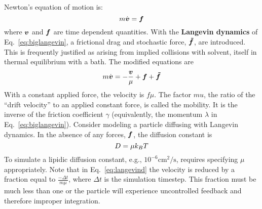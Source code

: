 
 \label{sec:timescales}


Newton's equation of motion is:
\begin{equation}
m \dot{\boldsymbol{v}} = \boldsymbol{f}
\end{equation}
where $\boldsymbol{v}$ and $\boldsymbol{f}$ are time dependent quantities.
With the {\bf Langevin dynamics} of Eq.~\ref{eq:biglangevin}, a frictional drag and stochastic force, $\boldsymbol{\tilde{f}}$, are introduced.
This is frequently justified as arising from implied collisions with solvent, itself in thermal equilibrium with a bath.
The modified equations are
\begin{equation}
m \dot{\boldsymbol{v}} = -\frac{\boldsymbol{v}}{\mu} + \boldsymbol{f} + \boldsymbol{\tilde{f}}
\end{equation}
With a constant applied force, the velocity is $f \mu$.
The factor $mu$, the ratio of the ``drift velocity'' to an applied constant force, is called the mobility. 
It is the inverse of the friction coefficient $\gamma$ (equivalently, the momentum $\lambda$ in Eq.~\ref{eq:biglangevin}).
Consider modeling a particle diffusing with Langevin dynamics.
In the absence of any forces, $\boldsymbol{f}$, the diffusion constant is
\begin{equation}
D = \mu k_B T
\end{equation}
To simulate a lipidic diffusion constant, e.g., $10^{-6} \textrm{cm}^2/\textrm{s}$, requires specifying $\mu$ appropriately.
Note that in Eq.~\ref{eq:langevind} the velocity is reduced by a fraction equal to $\frac{-\Delta t}{m \mu}$,
where $\Delta t$ is the simulation timestep.
This fraction must be much less than one or the particle will experience uncontrolled feedback and therefore improper integration.



